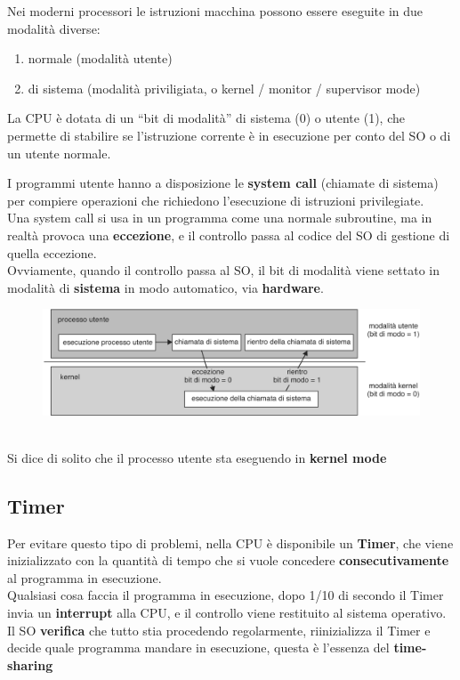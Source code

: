 Nei moderni processori le istruzioni macchina possono
essere eseguite in due modalità diverse:
\begin{enumerate}
    \item normale (modalità utente)
    \item di sistema (modalità priviligiata, o kernel / monitor / supervisor mode)
\end{enumerate}
La CPU è dotata di un “bit di modalità” di sistema (0) o utente (1), che permette di stabilire se l’istruzione corrente è in esecuzione per conto del SO o di un utente normale.


I programmi utente hanno a disposizione le \textbf{system call} (chiamate di sistema) per compiere operazioni che richiedono l’esecuzione di istruzioni privilegiate.\\
Una system call si usa in un programma come una normale subroutine, ma in realtà provoca una \textbf{eccezione}, e il controllo passa al codice del SO di gestione di quella
eccezione.\\
Ovviamente, quando il controllo passa al SO, il bit di modalità viene settato in modalità di \textbf{sistema} in modo automatico, via \textbf{hardware}.
\begin{figure}[h]
    \centering
    \includegraphics[width=0.5\linewidth]{images/so-process-managing.png}
\end{figure} \\
Si dice di solito che il processo utente sta eseguendo in \textbf{kernel mode}

\subsection{Timer}

Per evitare questo tipo di problemi, nella CPU è disponibile un \textbf{Timer}, che viene inizializzato con la quantità di tempo che si vuole concedere \textbf{consecutivamente} al programma in esecuzione.\\
Qualsiasi cosa faccia il programma in esecuzione, dopo 1/10 di secondo il Timer invia un \textbf{interrupt} alla CPU, e il controllo viene restituito al sistema operativo.
Il SO \textbf{verifica} che tutto stia procedendo regolarmente, riinizializza il Timer e decide quale programma mandare in esecuzione, questa è l'essenza del \textbf{time-sharing}

